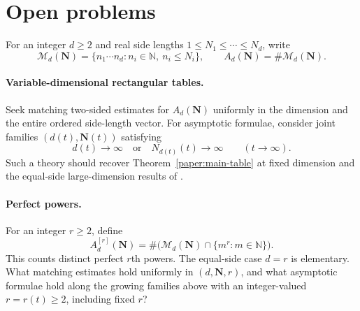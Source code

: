 \section{Open problems}
\label{sec:open-problems}

For an integer $d\ge2$ and real side lengths
$1\le N_1\le\cdots\le N_d$, write
\[
 \mathcal M_d(\mathbf N)
 =\{n_1\cdots n_d:n_i\in\mathbb N,\ n_i\le N_i\},
 \qquad A_d(\mathbf N)=\#\mathcal M_d(\mathbf N).
\]

\paragraph{Variable-dimensional rectangular tables.}
Seek matching two-sided estimates for $A_d(\mathbf N)$ uniformly in
the dimension and the entire ordered side-length vector. For asymptotic
formulae, consider joint families $(d(t),\mathbf N(t))$ satisfying
\[
 d(t)\longrightarrow\infty
 \quad\text{or}\quad N_{d(t)}(t)\longrightarrow\infty
 \qquad(t\to\infty).
\]
Such a theory
should recover Theorem~\ref{paper:main-table} at fixed dimension and
the equal-side large-dimension results of \cite{SabuncuTafula2026}.

\paragraph{Perfect powers.}
For an integer $r\ge2$, define
\[
 A_d^{[r]}(\mathbf N)
 =\#\bigl(\mathcal M_d(\mathbf N)\cap\{m^r:m\in\mathbb N\}\bigr).
\]
This counts distinct perfect $r$th powers. The equal-side case $d=r$
is elementary. What matching estimates hold uniformly in
$(d,\mathbf N,r)$, and what asymptotic formulae hold along the growing
families above with an integer-valued $r=r(t)\ge2$, including fixed $r$?
